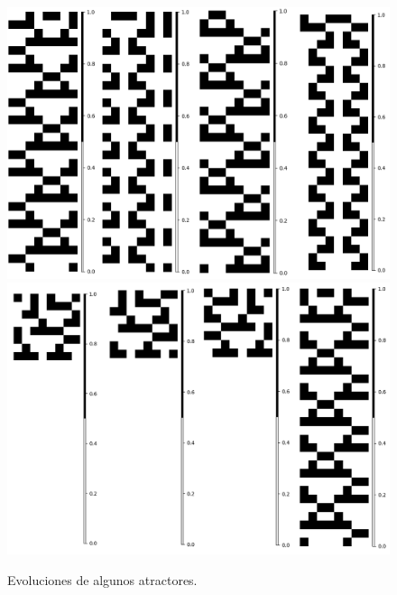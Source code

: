 \documentclass[11pt]{article}
\begin{document}
			\begin{figure}[H]
			\centering
			\includegraphics[scale=0.3]{resources/Atractores22/atractor_22_size_8_res.png}
			\includegraphics[scale=0.3]{resources/Atractores22/atractor_22_size_8_res1.png}
			\caption{Evoluciones de algunos atractores.}\label{fig:picture}
			\end{figure}
\end{document}
